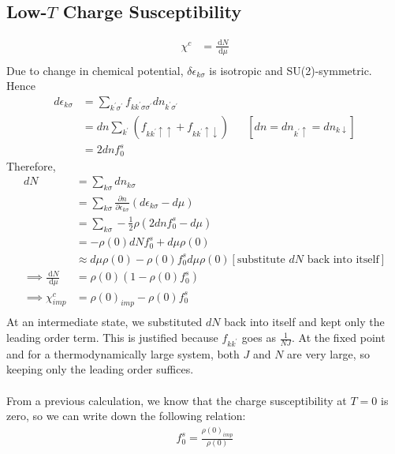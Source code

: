 \documentclass[twoside]{report}
\numberwithin{equation}{section}
\begin{document}
\subsection{Low-\(T\) Charge Susceptibility}
\begin{equation}\begin{aligned}
	\chi^c &= \frac{\:\mathrm{d}N}{\:\mathrm{d}\mu}\\
\end{aligned}\end{equation}
Due to change in chemical potential, \(\delta\epsilon_{k\sigma}\) is isotropic and SU(2)-symmetric. Hence
\begin{equation}\begin{aligned}
	d\epsilon_{k\sigma} &= \sum_{k^\prime\sigma^\prime}f_{kk^\prime\sigma\sigma^\prime}d n_{k^\prime\sigma^\prime}\\
			    &= d n\sum_{k^\prime}\left(f_{kk^\prime\uparrow \uparrow} + f_{kk^\prime \uparrow \downarrow}\right) && \left[dn = dn_{k^\prime \uparrow} = dn_{k \downarrow}\right] \\
			    &= 2dn f_0^s
\end{aligned}\end{equation}
Therefore,
\begin{equation}\begin{aligned}
	dN &= \sum_{k\sigma}dn_{k\sigma} \\
	   &= \sum_{k\sigma}\frac{\partial{n}}{\partial{\epsilon_{k\sigma}}}\left( d\epsilon_{k\sigma} - d\mu \right) \\
	   &= \sum_{k\sigma}-\frac{1}{2}\rho\left(2dn f_0^s - d\mu \right) \\
	   &= -\rho(0) d N f_0^s + d\mu \rho(0) \\
	   &\approx d\mu \rho(0) - \rho(0) f_0^s d\mu \rho(0) \left[\text{substitute \(dN\) back into itself}\right] \\
	\implies \frac{\:\mathrm{d}N}{\:\mathrm{d}\mu} &= \rho(0)\left( 1 - \rho(0)f_0^s \right) \\
	\implies \chi^c_{imp} &= \rho(0)_{imp} - \rho(0)f_0^s \\
\end{aligned}\end{equation}
At an intermediate state, we substituted \(dN\) back into itself and kept only the leading order term. This is justified because \(f_{kk^\prime}\) goes as \(\frac{1}{N J}\). At the fixed point and for a thermodynamically large system, both \(J\) and \(N\) are very large, so keeping only the leading order suffices.
\\\\From a previous calculation, we know that the charge susceptibility at \(T=0\) is zero, so we can write down the following relation:
\begin{equation}\begin{aligned}
	\label{fp_constraint}
	f_0^s = \frac{\rho(0)_{imp}}{\rho(0)}
\end{aligned}\end{equation}
\end{document}
